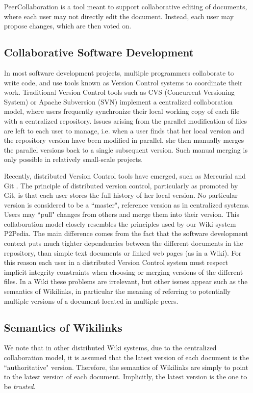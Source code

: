 PeerCollaboration \cite{springerlink:peercollaboration} is a tool meant to support collaborative editing of documents, where each user may not directly edit the document. Instead, each user may propose changes, which are then voted on. 

\subsection{Collaborative Software Development}

In most software development projects, multiple programmers collaborate to write code, and use tools known as Version Control systems to coordinate their work. Traditional Version Control tools such as CVS (Concurrent Versioning System) or Apache Subversion (SVN) implement a centralized collaboration model, where users frequently synchronize their local working copy of each file with a centralized repository. Issues arising from the parallel modification of files are left to each user to manage, i.e. when a user finds that her local version and the repository version have been modified in parallel, she then manually merges the parallel versions back to a single subsequent version. Such manual merging is only possible in relatively small-scale projects.

Recently, distributed Version Control tools have emerged, such as Mercurial\cite{DBLP:books/daglib/0022917} and Git \cite{Swicegood:2008:GIT}. The principle of distributed version control, particularly as promoted by Git, is that each user stores the full history of her local version. No particular version is considered to be a ``master", reference version as in centralized systems. Users may ``pull" changes from others and merge them into their version. This collaboration model closely resembles the principles used by our Wiki system P2Pedia. The main difference comes from the fact that the software development context puts much tighter dependencies between the different documents in the repository, than simple text documents or linked web pages (as in a Wiki). For this reason each user in a distributed Version Control system must respect implicit integrity constraints when choosing or merging versions of the different files. In a Wiki these problems are irrelevant, but other issues appear such as the semantics of Wikilinks, in particular the meaning of referring to potentially multiple versions of a document located in multiple peers.

\subsection{Semantics of Wikilinks}

We note that in other distributed Wiki systems, due to the centralized collaboration model, it is assumed that the latest version of each document is the ``authoritative" version. Therefore, the semantics of Wikilinks are simply to point to the latest version of each document. Implicitly, the latest version is the one to be \emph{trusted}.
